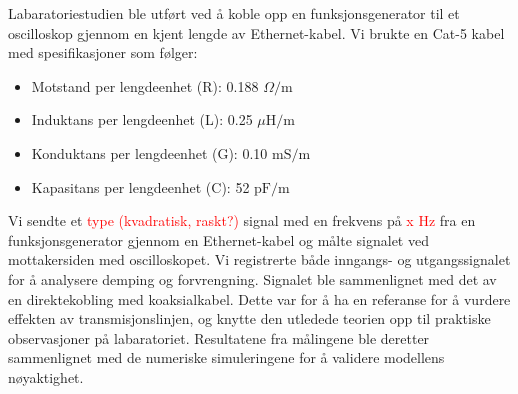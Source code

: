 Labaratoriestudien ble utført ved å koble opp en funksjonsgenerator til et oscilloskop gjennom en kjent lengde av Ethernet-kabel. Vi brukte en Cat-5 kabel med spesifikasjoner som følger:
\begin{itemize}
    \item Motstand per lengdeenhet (R): 0.188 $\Omega/\mathrm{m}$
    \item Induktans per lengdeenhet (L): 0.25 $\mu \mathrm{H}/\mathrm{m}$
    \item Konduktans per lengdeenhet (G): 0.10 $\mathrm{mS}/\mathrm{m}$
    \item Kapasitans per lengdeenhet (C): 52 $\mathrm{pF}/\mathrm{m}$
\end{itemize}
Vi sendte et \textcolor{red}{type (kvadratisk, raskt?)} signal med en frekvens på \textcolor{red}{x Hz} fra en funksjonsgenerator gjennom en Ethernet-kabel og målte signalet ved mottakersiden med oscilloskopet. Vi registrerte både inngangs- og utgangssignalet for å analysere demping og forvrengning. Signalet ble sammenlignet med det av en direktekobling med koaksialkabel. Dette var for å ha en referanse for å vurdere effekten av transmisjonslinjen, og knytte den utledede teorien opp til praktiske observasjoner på labaratoriet. Resultatene fra målingene ble deretter sammenlignet med de numeriske simuleringene for å validere modellens nøyaktighet.
